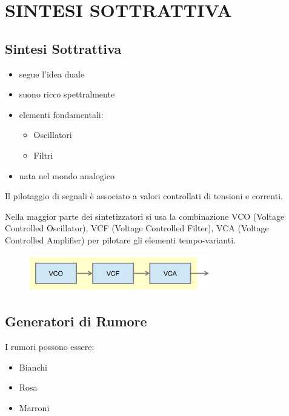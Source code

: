 \chapter{SINTESI SOTTRATTIVA}
\section*{Sintesi Sottrattiva}

\begin{itemize}
    \item segue l’idea duale
    \item suono ricco spettralmente
    \item elementi fondamentali:
    \begin{itemize}
        \item Oscillatori
        \item Filtri
    \end{itemize}
    \item nata nel mondo analogico
\end{itemize}

Il pilotaggio di segnali è associato a valori controllati di tensioni e correnti.

Nella maggior parte dei sintetizzatori si usa la combinazione VCO (Voltage Controlled Oscillator), VCF (Voltage Controlled Filter), VCA (Voltage Controlled Amplifier) per pilotare gli elementi tempo-varianti.

\begin{figure}[H]
    \centering
    \includegraphics[width=0.7\textwidth]{capitoli/capitolo12/immagini/image1.png}
\end{figure}

\section{Generatori di Rumore}

I rumori possono essere:
\begin{itemize}
    \item Bianchi
    \item Rosa
    \item Marroni
\end{itemize}

